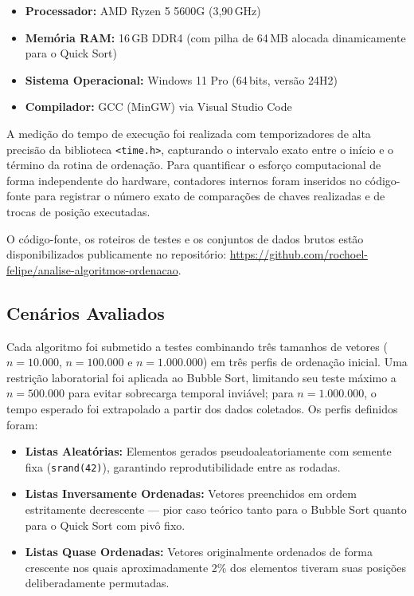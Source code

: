 \documentclass[12pt]{article}
\begin{document}
\begin{itemize}
    \item \textbf{Processador:} AMD Ryzen 5 5600G (3,90\,GHz)
    \item \textbf{Memória RAM:} 16\,GB DDR4 (com pilha de 64\,MB alocada
          dinamicamente para o Quick Sort)
    \item \textbf{Sistema Operacional:} Windows 11 Pro (64\,bits, versão 24H2)
    \item \textbf{Compilador:} GCC (MinGW) via Visual Studio Code
\end{itemize}

A medição do tempo de execução foi realizada com temporizadores de alta
precisão da biblioteca \texttt{<time.h>}, capturando o intervalo exato entre
o início e o término da rotina de ordenação. Para quantificar o esforço
computacional de forma independente do hardware, contadores internos foram
inseridos no código-fonte para registrar o número exato de comparações de
chaves realizadas e de trocas de posição executadas.

O código-fonte, os roteiros de testes e os conjuntos de dados brutos estão
disponibilizados publicamente no repositório:
{\small\url{https://github.com/rochoel-felipe/analise-algoritmos-ordenacao}}.

\subsection{Cenários Avaliados}

Cada algoritmo foi submetido a testes combinando três tamanhos de vetores
($n = 10.000$, $n = 100.000$ e $n = 1.000.000$) em três perfis de ordenação
inicial. Uma restrição laboratorial foi aplicada ao Bubble Sort, limitando
seu teste máximo a $n = 500.000$ para evitar sobrecarga temporal inviável;
para $n = 1.000.000$, o tempo esperado foi extrapolado a partir dos dados
coletados. Os perfis definidos foram:

\begin{itemize}
    \item \textbf{Listas Aleatórias:} Elementos gerados pseudoaleatoriamente
          com semente fixa (\texttt{srand(42)}), garantindo reprodutibilidade
          entre as rodadas.
    \item \textbf{Listas Inversamente Ordenadas:} Vetores preenchidos em
          ordem estritamente decrescente — pior caso teórico tanto para o
          Bubble Sort quanto para o Quick Sort com pivô fixo.
    \item \textbf{Listas Quase Ordenadas:} Vetores originalmente ordenados de
          forma crescente nos quais aproximadamente 2\% dos elementos tiveram
          suas posições deliberadamente permutadas.
\end{itemize}
\end{document}
